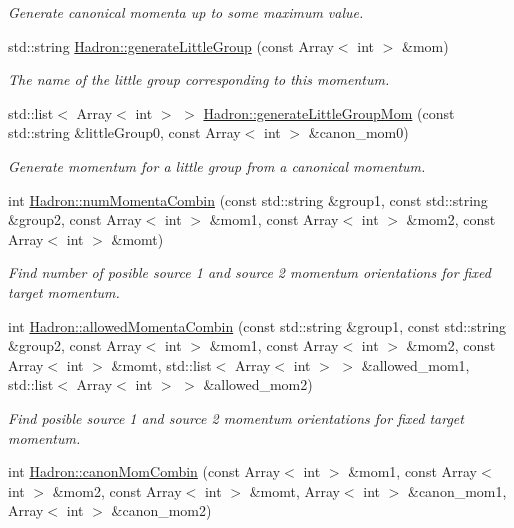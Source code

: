 \begin{DoxyCompactItemize}
\begin{DoxyCompactList}\small\item\em Generate canonical momenta up to some maximum value. \end{DoxyCompactList}\item 
std\+::string \mbox{\hyperlink{namespaceHadron_a511bab858a88c02ec88a697fd5430e0d}{Hadron\+::generate\+Little\+Group}} (const Array$<$ int $>$ \&mom)
\begin{DoxyCompactList}\small\item\em The name of the little group corresponding to this momentum. \end{DoxyCompactList}\item 
std\+::list$<$ Array$<$ int $>$ $>$ \mbox{\hyperlink{namespaceHadron_a12d4f9d40cac2700ebb7a7420f20987b}{Hadron\+::generate\+Little\+Group\+Mom}} (const std\+::string \&little\+Group0, const Array$<$ int $>$ \&canon\+\_\+mom0)
\begin{DoxyCompactList}\small\item\em Generate momentum for a little group from a canonical momentum. \end{DoxyCompactList}\item 
int \mbox{\hyperlink{namespaceHadron_afc213211f9c79372b449aac381596d1c}{Hadron\+::num\+Momenta\+Combin}} (const std\+::string \&group1, const std\+::string \&group2, const Array$<$ int $>$ \&mom1, const Array$<$ int $>$ \&mom2, const Array$<$ int $>$ \&momt)
\begin{DoxyCompactList}\small\item\em Find number of posible source 1 and source 2 momentum orientations for fixed target momentum. \end{DoxyCompactList}\item 
int \mbox{\hyperlink{namespaceHadron_a9aa2554e3522f9947be804d36603b887}{Hadron\+::allowed\+Momenta\+Combin}} (const std\+::string \&group1, const std\+::string \&group2, const Array$<$ int $>$ \&mom1, const Array$<$ int $>$ \&mom2, const Array$<$ int $>$ \&momt, std\+::list$<$ Array$<$ int $>$ $>$ \&allowed\+\_\+mom1, std\+::list$<$ Array$<$ int $>$ $>$ \&allowed\+\_\+mom2)
\begin{DoxyCompactList}\small\item\em Find posible source 1 and source 2 momentum orientations for fixed target momentum. \end{DoxyCompactList}\item 
int \mbox{\hyperlink{namespaceHadron_ab874ef7e96f2c243de41a6ef639bf3c3}{Hadron\+::canon\+Mom\+Combin}} (const Array$<$ int $>$ \&mom1, const Array$<$ int $>$ \&mom2, const Array$<$ int $>$ \&momt, Array$<$ int $>$ \&canon\+\_\+mom1, Array$<$ int $>$ \&canon\+\_\+mom2)

\end{DoxyCompactItemize}
